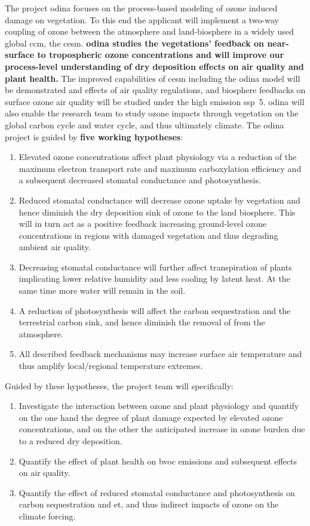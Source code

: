 
The project \gls{odina} focuses on the process-based modeling of ozone induced damage on vegetation. To this end the applicant will implement a two-way coupling of ozone between the atmosphere and land-biosphere in a widely used global \gls{ccm}, the \gls{cesm}. \textbf{\gls{odina} studies the vegetations' feedback on near-surface to tropospheric ozone concentrations and will improve our process-level understanding of dry deposition effects on air quality and plant health.} The improved capabilities of \gls{cesm} including the \gls{odina} model will be demonstrated and effects of air quality regulations, and biosphere feedbacks on surface ozone air quality will be studied under the high emission \gls{ssp}~5. \gls{odina} will also enable the research team to study ozone impacts through vegetation on the global carbon cycle and water cycle, and thus ultimately climate.
The \gls{odina} project is guided by \textbf{five working hypotheses}: 

\begin{enumerate}
\itemsep0pt
\item Elevated ozone concentrations affect plant physiology via a reduction of the maximum electron transport rate and maximum carboxylation efficiency and a subsequent decreased stomatal conductance and photosynthesis. 
\item Reduced stomatal conductance will decrease ozone uptake by vegetation and hence diminish the dry deposition sink of ozone to the land biosphere. This will in turn act as a positive feedback increasing ground-level ozone concentrations in regions with damaged vegetation and thus degrading ambient air quality.
\item Decreasing stomatal conductance will further affect transpiration of plants implicating lower relative humidity and less cooling by latent heat. At the same time more water will remain in the soil.
\item A reduction of photosynthesis will affect the carbon sequestration and the terrestrial carbon sink, and hence diminish the removal of  from the atmosphere.
\item All described feedback mechanisms may increase surface air temperature and thus amplify local/regional temperature extremes.
\end{enumerate}

Guided by these hypotheses, the project team will specifically:
\begin{enumerate}
\itemsep0pt
\item Investigate the interaction between ozone and plant physiology and quantify on the one hand the degree of plant damage expected by elevated ozone concentrations, and on the other the anticipated increase in ozone burden due to a reduced dry deposition.
\item Quantify the effect of plant health on \gls{bvoc} emissions and subsequent effects on air quality.
\item Quantify the effect of reduced stomatal conductance and photosynthesis on carbon sequestration and \gls{et}, and thus indirect impacts of ozone on the climate forcing.
\end{enumerate}

